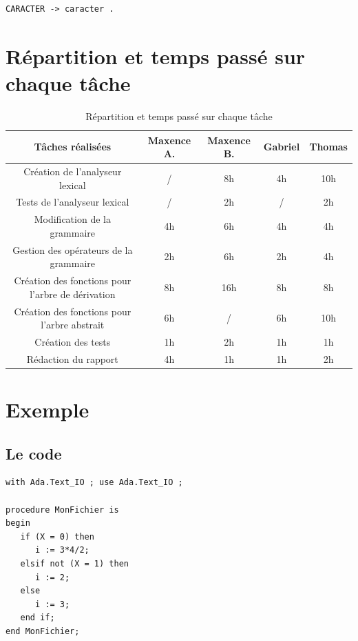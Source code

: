 \documentclass[11pt]{article}
\begin{document}
\begin{appendix}
\begin{lstlisting}[caption={La grammaire que nous avons obtenue}]
CARACTER -> caracter .
\end{lstlisting}
	
\newpage

\section{Répartition et temps passé sur chaque tâche}

    \begin{table}[h]
        \centering
        \begin{tabular}{|c|c|c|c|c|}
            \hline
            Tâches réalisées & Maxence A. & Maxence B. & Gabriel & Thomas \\
            \hline
            Création de l'analyseur lexical & / & 8h & 4h & 10h \\
            Tests de l'analyseur lexical & / & 2h & / & 2h \\
            Modification de la grammaire & 4h & 6h & 4h & 4h  \\
            Gestion des opérateurs de la grammaire & 2h & 6h & 2h & 4h \\
            Création des fonctions pour l'arbre de dérivation & 8h & 16h & 8h & 8h \\
            Création des fonctions pour l'arbre abstrait & 6h & / & 6h & 10h \\
            Création des tests & 1h & 2h & 1h & 1h \\
            Rédaction du rapport & 4h & 1h & 1h & 2h \\
            \hline
        \end{tabular}
        \caption{Répartition et temps passé sur chaque tâche}
        \label{tab:exemple}
    \end{table}

\section{Exemple}

\subsection{Le code}

\begin{lstlisting}[caption={Code d'un programme de test}]
with Ada.Text_IO ; use Ada.Text_IO ;

procedure MonFichier is
begin
   if (X = 0) then
      i := 3*4/2;
   elsif not (X = 1) then
      i := 2;
   else
      i := 3;
   end if;
end MonFichier;


\end{lstlisting}
\end{appendix}
\end{document}
